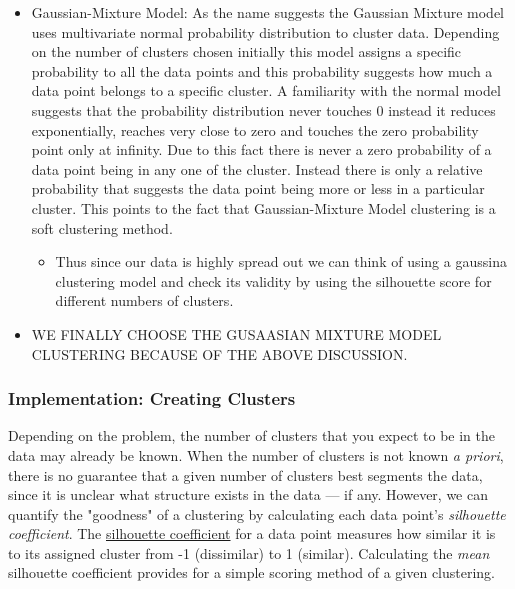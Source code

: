 \documentclass[11pt]{article}
\providecommand{\tightlist}{%
      \setlength{\itemsep}{0pt}\setlength{\parskip}{0pt}}
\begin{document}
\begin{itemize}
\tightlist
\item
  Gaussian-Mixture Model: As the name suggests the Gaussian Mixture
  model uses multivariate normal probability distribution to cluster
  data. Depending on the number of clusters chosen initially this model
  assigns a specific probability to all the data points and this
  probability suggests how much a data point belongs to a specific
  cluster. A familiarity with the normal model suggests that the
  probability distribution never touches 0 instead it reduces
  exponentially, reaches very close to zero and touches the zero
  probability point only at infinity. Due to this fact there is never a
  zero probability of a data point being in any one of the cluster.
  Instead there is only a relative probability that suggests the data
  point being more or less in a particular cluster. This points to the
  fact that Gaussian-Mixture Model clustering is a soft clustering
  method.

  \begin{itemize}
  \tightlist
  \item
    Thus since our data is highly spread out we can think of using a
    gaussina clustering model and check its validity by using the
    silhouette score for different numbers of clusters.
  \end{itemize}
\item
  WE FINALLY CHOOSE THE GUSAASIAN MIXTURE MODEL CLUSTERING BECAUSE OF
  THE ABOVE DISCUSSION.
\end{itemize}

    \subsubsection{Implementation: Creating
Clusters}\label{implementation-creating-clusters}

Depending on the problem, the number of clusters that you expect to be
in the data may already be known. When the number of clusters is not
known \emph{a priori}, there is no guarantee that a given number of
clusters best segments the data, since it is unclear what structure
exists in the data --- if any. However, we can quantify the "goodness"
of a clustering by calculating each data point's \emph{silhouette
coefficient}. The
\href{http://scikit-learn.org/stable/modules/generated/sklearn.metrics.silhouette_score.html}{silhouette
coefficient} for a data point measures how similar it is to its assigned
cluster from -1 (dissimilar) to 1 (similar). Calculating the \emph{mean}
silhouette coefficient provides for a simple scoring method of a given
clustering.
\end{document}
